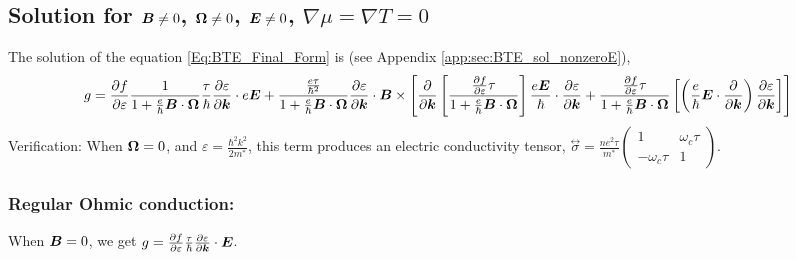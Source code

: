 \documentclass{report}
\renewcommand\vec[1]{\ensuremath\boldsymbol{#1}} %
\begin{document}

\subsection{Solution for $\vec{B}\neq0$, $\vec{\Omega}\neq 0$, $\vec{E} \neq 0$, $\nabla \mu = \nabla T = 0$}
The solution of the equation \eqref{Eq:BTE_Final_Form} is (see Appendix \ref{app:sec:BTE_sol_nonzeroE}),
\begin{equation}\label{Eq:gnonzeroE}
	g = \frac{\partial f} {\partial \varepsilon}\frac{1}{1 + \frac{e}{\hbar} \vec{B}\cdot\vec{\Omega}}
	\frac{\tau}{\hbar} \frac{\partial \varepsilon}{\partial \vec{k}}\cdot e \vec{E} + \frac{\frac{e \tau}{\hbar^2} }{1 + \frac{e}{\hbar} \vec{B}\cdot\vec{\Omega}} \frac{\partial \varepsilon}{\partial \vec{k}} \cdot \vec{B} \times \left[ \frac{\partial}{\partial \vec{k}} \left[ \frac{\frac{\partial f} {\partial \varepsilon} \tau}{1 + \frac{e}{\hbar} \vec{B}\cdot\vec{\Omega}}
	\right] \frac{e \vec{E}}{\hbar} \cdot \frac{\partial \varepsilon}{\partial \vec{k}} + \frac{\frac{\partial f} {\partial \varepsilon} \tau}{1 + \frac{e}{\hbar} \vec{B}\cdot\vec{\Omega}} \left[\left(\frac{e}{\hbar} \vec{E}\cdot \frac{\partial }{\partial \vec{k}} \right)\frac{\partial \varepsilon}{\partial \vec{k}} \right] \right]
\end{equation}
Verification: When $\vec{\Omega} = 0$, and $\varepsilon = \frac{\hbar^2 k^2}{2 m^*}$, this term produces an electric conductivity tensor, $\stackrel{\leftrightarrow}{\sigma} = \frac{n e^2 \tau}{m^*} \begin{pmatrix}
	1 & \omega_c \tau \\
	-\omega_c \tau & 1 
\end{pmatrix}$.

\subsubsection{Regular Ohmic conduction:}\label{subsubsec:regularOhmic}
 When $\vec{B} = 0$, we get $ g = \frac{\partial f} {\partial \varepsilon}
\frac{\tau}{\hbar} \frac{\partial \varepsilon}{\partial \vec{k}}\cdot  \vec{E}
$.
\end{document}
